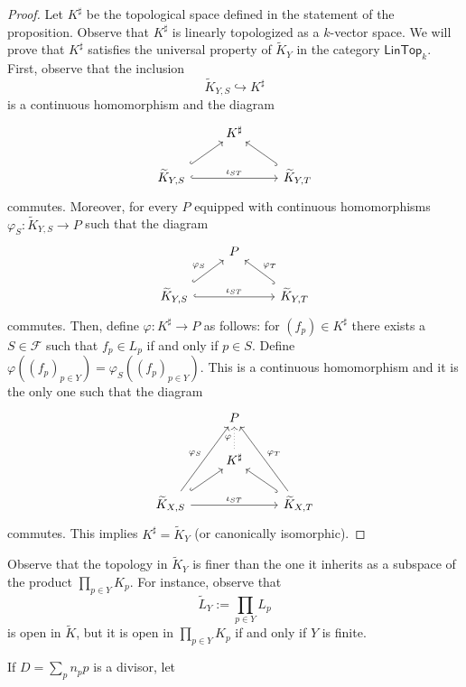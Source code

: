 \begin{proof}
	Let $K^{\sharp}$ be the topological space defined in the statement of the proposition. Observe that $K^{\sharp}$ is linearly topologized as a $k$-vector space. We will prove that $K^{\sharp}$ satisfies the universal property of $\widetilde{K}_{Y}$ in the category $\mathsf{LinTop}_{k}$. First, observe that the inclusion
	\[
		\widetilde{K}_{Y,S} \hookrightarrow K^{\sharp}
	\]
	is a continuous homomorphism and the diagram
	\[
		\begin{tikzcd}
			& K^{\sharp} & \\
			\widetilde{K}_{Y,S} \arrow[rr, "\iota_{ST}", hook]\arrow[ur, hook] & & \widetilde{K}_{Y,T} \arrow[lu, hook]
		\end{tikzcd}
	\]
	commutes. Moreover, for every $P$ equipped with continuous homomorphisms $\varphi_{S}\colon \widetilde{K}_{Y,S}\to P$ such that the diagram 
	\[
		\begin{tikzcd}
			& P & \\
			\widetilde{K}_{Y,S} \arrow[rr, "\iota_{ST}", hook]\arrow[ur, hook, "\varphi_{S}"] & & \widetilde{K}_{Y,T} \arrow[lu, hook, "\varphi_{T}", swap]
		\end{tikzcd}
	\]
	commutes. Then, define $\varphi\colon K^{\sharp} \to P$ as follows: for $(f_{p}) \in K^{\sharp}$ there exists a $S\in \mathscr{F}$ such that $f_{p} \in L_{p}$ if and only if $p \in S$. Define $\varphi( (f_{p})_{p\in Y} ) = \varphi_{S}( (f_{p})_{p\in Y} )$. This is a continuous homomorphism and it is the only one such that the diagram
	\[
		\begin{tikzcd}
			& P & \\
			& K^{\sharp} \arrow[u, "\varphi", dotted] & \\
			\widetilde{K}_{X,S} \arrow[rr, "\iota_{ST}"]\arrow[uur, "\varphi_{S}"]\arrow[ur, hook] & & \widetilde{K}_{X,T} \arrow[luu, "\varphi_{T}", swap] \arrow[lu, hook]
		\end{tikzcd}
	\]
	commutes. This implies $K^{\sharp} = \widetilde{K}_{Y}$ (or canonically isomorphic).
\end{proof}
\begin{remark}\label{rem:adèle-not-subspace-topology}
	Observe that the topology in $\widetilde{K}_{Y}$ is finer than the one it inherits as a subspace of the product $\prod_{p\in Y}K_{p}$. For instance, observe that 
	\[
		\widetilde{L}_{Y} := \prod_{p\in Y}L_{p} 
	\] 
	is open in $\widetilde{K}$, but it is open in $\prod_{p\in Y} K_{p}$ if and only if $Y$ is finite. 
\end{remark}
If $D = \sum_{p}n_{p}p$ is a divisor, let
